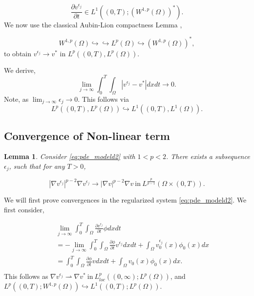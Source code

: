 \documentclass[10pt]{amsart}
\theoremstyle{plain}
\newtheorem{lemma}[theorem]{Lemma}
\theoremstyle{definition}
\begin{document}
 \begin{equation}
 \frac{\partial v^{\epsilon_{j}}}{\partial t} \in L^{1}((0,T); (W^{1,p}(\Omega))^{*}).
\end{equation}
%
We now use the classical Aubin-Lion compactness Lemma \cite{robinson2003infinite}, 

 \begin{equation}
W^{1,p}(\Omega) \hookrightarrow \hookrightarrow L^{p}(\Omega) \hookrightarrow \left(W^{1,p}(\Omega)\right)^{*},
 \end{equation}
%
 to obtain $v^{\epsilon_{j}} \rightarrow v^{*}$ in 
 $L^{p}((0,T), L^{p}(\Omega))$.

We derive, 
\begin{equation}
\label{eq:56e}
\lim_{j \rightarrow \infty}  \int^{T}_{0}\int_{\Omega}|v^{\epsilon_{j}}-v^{*}|dxdt \rightarrow 0 .
 \end{equation}
Note, as $\lim_{j \rightarrow \infty}\epsilon_{j} \rightarrow 0$. This follows via 
\begin{equation}
L^{p}((0,T), L^{p}(\Omega)) \hookrightarrow L^{1}((0,T), L^{1}(\Omega)).
 \end{equation}

\subsection{Convergence of Non-linear term} 

\begin{lemma}
\label{lem:cnt}
Consider \eqref{eq:pde_modeld2} with $1<p<2$. There exists a subsequence ${\epsilon_{j}}$, such that for any $T>0$,

\begin{equation}
|\nabla v^{\epsilon_{j}}|^{p-2}  \nabla v^{\epsilon_{j}} \rightarrow |\nabla v|^{p-2}  \nabla v \ \mbox{in} \ L^{\frac{p}{p-1}}(\Omega \times (0,T)).
 \end{equation}
\end{lemma}
%
We will first prove convergences in the regularized system \eqref{eq:pde_modeld2}. We first consider,

\begin{eqnarray}
 && \lim_{j \rightarrow \infty} \int^{T}_{0} \int_{\Omega} \frac{\partial v^{\epsilon_{j}}}{\partial t} \phi dx dt \nonumber \\
 && = - \lim_{j \rightarrow \infty}\int^{T}_{0} \int_{\Omega} \frac{\partial \phi}{\partial t} v^{\epsilon_{j}} dx dt + \int_{\Omega}v^{\epsilon_{j}}_{0}(x)\phi_{0}(x)dx \nonumber \\
 && =\int^{T}_{0} \int_{\Omega} \frac{\partial \phi}{\partial t} v dx dt + \int_{\Omega}v_{0}(x)\phi_{0}(x)dx . \  \nonumber \\
\end{eqnarray}
This follows as $\nabla v^{\epsilon_{j}} \rightharpoonup \nabla v^{*}  \ \mbox{in} \ L^{p}_{loc}((0,\infty);L^{p}(\Omega))$, and $L^{p}((0,T);W^{1,p}(\Omega)) \hookrightarrow L^{1}((0,T);L^{p}(\Omega))$.
\end{document}

